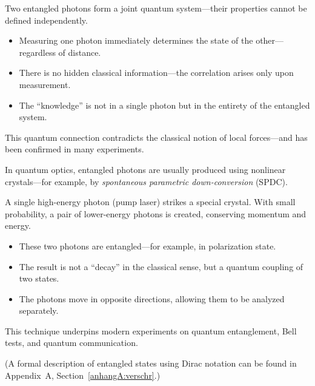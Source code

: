\begin{tcolorbox}[didaktikbox, title=What Does Entanglement Mean?]
	\label{box:verschr}
	Two entangled photons form a joint quantum system—their properties cannot be defined independently.
	
	\begin{itemize}
		\item Measuring one photon immediately determines the state of the other—regardless of distance.
		\item There is no hidden classical information—the correlation arises only upon measurement.
		\item The “knowledge” is not in a single photon but in the entirety of the entangled system.
	\end{itemize}
	
	This quantum connection contradicts the classical notion of local forces—and has been confirmed in many experiments.
\end{tcolorbox}

\begin{tcolorbox}[physikbox, title=How Are Entangled Photons Produced?]
	\label{box:spdc}
	In quantum optics, entangled photons are usually produced using nonlinear crystals—for example, by \emph{spontaneous parametric down-conversion} (SPDC).
	
	A single high-energy photon (pump laser) strikes a special crystal. With small probability, a pair of lower-energy photons is created, conserving momentum and energy.
	
	\begin{itemize}
		\item These two photons are entangled—for example, in polarization state.
		\item The result is not a “decay” in the classical sense, but a quantum coupling of two states.
		\item The photons move in opposite directions, allowing them to be analyzed separately.
	\end{itemize}
	
	This technique underpins modern experiments on quantum entanglement, Bell tests, and quantum communication.
\end{tcolorbox}
(A formal description of entangled states using Dirac notation can be found in Appendix~A, Section~\ref{anhangA:verschr}.)

